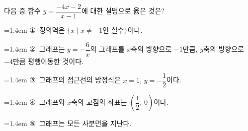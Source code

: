 다음 중 함수 $y=\dfrac{-4x-2}{x-1}$에 대한 설명으로 옳은 것은?
\par\medskip\par\noindent\hangindent=1.4em {\small ①}\ 정의역은 $\{x \mid x\ne -1$인 실수$\}$이다.\par\noindent\hangindent=1.4em {\small ②}\ 그래프는 $y=-\dfrac{6}{x}$의 그래프를 $x$축의 방향으로 $-1$만큼, $y$축의 방향으로 $-4$만큼 평행이동한 것이다.\par\noindent\hangindent=1.4em {\small ③}\ 그래프의 점근선의 방정식은 $x=1$, $y=-\dfrac{1}{2}$이다.\par\noindent\hangindent=1.4em {\small ④}\ 그래프와 $x$축의 교점의 좌표는 $\left(\dfrac{1}{2},\,0\right)$이다.\par\noindent\hangindent=1.4em {\small ⑤}\ 그래프는 모든 사분면을 지난다.\par\medskip
